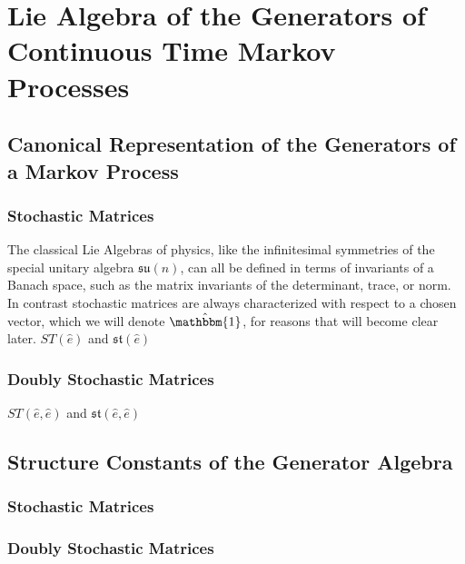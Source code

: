 \chapter{Lie Algebra of the Generators of Continuous Time Markov Processes}
\section{Canonical Representation of the Generators of a Markov Process}
\subsection{Stochastic Matrices}
The classical Lie Algebras of physics, like the infinitesimal symmetries
of the special unitary algebra $\mathfrak{su}(n)$, can all be defined in terms
of invariants of a Banach space, such as the matrix invariants of the 
determinant, trace, or norm. In contrast stochastic matrices are always 
characterized with respect to a chosen vector, which we will denote 
$\hat{\mathbbm{1}}$, for reasons that will become clear later.
$ST(\hat{e})$ and $\mathfrak{st}(\hat{e})$
\subsection{Doubly Stochastic Matrices}
$ST(\hat{e},\hat{e})$ and $\mathfrak{st}(\hat{e},\hat{e})$
\section{Structure Constants of the Generator Algebra}
\subsection{Stochastic Matrices}
\subsection{Doubly Stochastic Matrices}